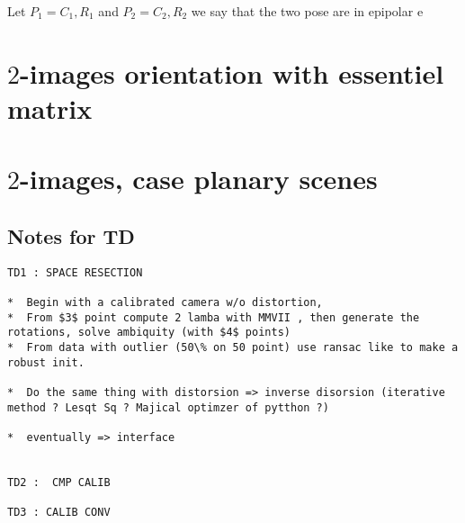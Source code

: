 Let $P_1={C_1,R_1}$ and $P_2={C_2,R_2}$ we say that the two pose are in
epipolar e






\section{$2$-images orientation with essentiel matrix}


\section{$2$-images, case planary scenes}



\subsection{Notes for TD}


\begin{verbatim}
TD1 : SPACE RESECTION

*  Begin with a calibrated camera w/o distortion,
*  From $3$ point compute 2 lamba with MMVII , then generate the rotations, solve ambiquity (with $4$ points)
*  From data with outlier (50\% on 50 point) use ransac like to make a robust init.

*  Do the same thing with distorsion => inverse disorsion (iterative method ? Lesqt Sq ? Majical optimzer of pytthon ?)

*  eventually => interface


TD2 :  CMP CALIB

TD3 : CALIB CONV
\end{verbatim}




